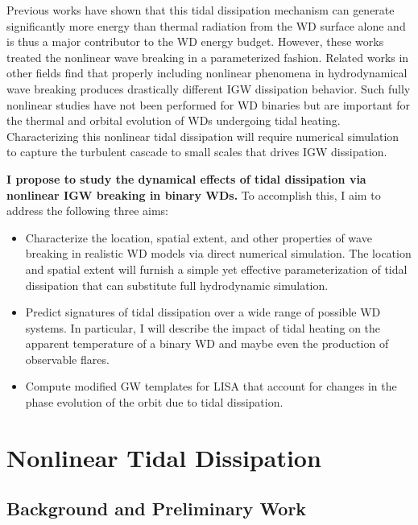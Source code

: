 \documentclass[12pt,
        usenames, %
        dvipsnames %
    ]{article}
\begin{document}
Previous works have shown that this tidal dissipation mechanism can generate
significantly more energy than thermal radiation from the WD surface alone and
is thus a major contributor to the WD energy budget\cite{fullerII,fullerIV}.
However, these works treated the nonlinear wave breaking in a parameterized
fashion. Related works in other fields find that properly including nonlinear
phenomena in hydrodynamical wave breaking produces drastically different IGW
dissipation behavior\cite{winters1994,barker_ogilvie}. Such fully nonlinear
studies have not been performed for WD binaries but are important for the
thermal and orbital evolution of WDs undergoing tidal heating. Characterizing
this nonlinear tidal dissipation will require numerical simulation to capture
the turbulent cascade to small scales that drives IGW dissipation.

\textbf{I propose to study the dynamical effects of tidal dissipation via
nonlinear IGW breaking in binary WDs.} To accomplish this, I aim to address the
following three aims:
\begin{itemize}
    \item Characterize the location, spatial extent, and other properties of
        wave breaking in realistic WD models via direct numerical simulation.
        The location and spatial extent will furnish a simple yet effective
        parameterization of tidal dissipation that can substitute full
        hydrodynamic simulation.

    \item Predict signatures of tidal dissipation over a wide range of possible
        WD systems. In particular, I will describe the impact of tidal heating
        on the apparent temperature of a binary WD and maybe even the production
        of observable flares.

    \item Compute modified GW templates for LISA that account for changes in the
        phase evolution of the orbit due to tidal dissipation.
\end{itemize}

\section{Nonlinear Tidal Dissipation}

\subsection{Background and Preliminary Work}
\end{document}
